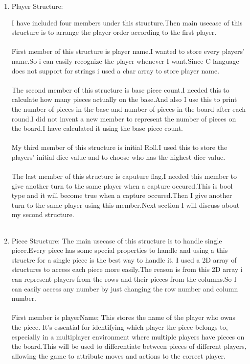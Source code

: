 \documentclass[a4paper,12pt]{article}
\begin{document}
\begin{enumerate}
	\item Player Structure:

I have included four members under this structure.Then main usecase of this structure is to arrange the player order according to the first player.\\ \\

First member of this structure is  player name.I wanted to store every players' name.So i can easily recognize the player whenever I want.Since C language does not support for strings i used a char array to store player name.\\ \\
The second member of this structure is base piece count.I needed this to calculate how many pieces actually on the base.And also I use this to print the number of pieces in the base and number of pieces in the board after each round.I did not invent a new member to represent the number of pieces on the board.I have calculated it using the base piece count.\\ \\
My third member of this structure is initial Roll.I used this to store the players' initial dice value and to choose who has the highest dice value.\\ \\
The last member of this structure is caputure flag.I needed this member to give another turn to the same player when a capture occured.This is bool type and it will become true when a capture occured.Then I give another turn to the same player using this member.Next section I will discuss about my second structure. \\  \\


	\item Piece Structure:
The main usecase of this structure is to handle single piece.Every piece has some special properties to handle and using a this structre for a single piece is the best way to handle it.
I used a 2D array of structures to access each piece more easily.The reason is from this 2D array i can represent players from the rows and their pieces from the columns.So I can easily access any number by just changing the row number and column number.\\ \\

First member is playerName; This stores the name of the player who owns the piece. It's essential for identifying which player the piece belongs to, especially in a multiplayer environment where multiple players have pieces on the board.This will be used to differentiate between pieces of different players, allowing the game to attribute moves and actions to the correct player.\\ \\


\end{enumerate}
\end{document}

